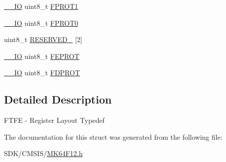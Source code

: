 \begin{DoxyCompactItemize}
\item 
\mbox{\hyperlink{core__cm4_8h_aec43007d9998a0a0e01faede4133d6be}{\+\_\+\+\_\+\+IO}} uint8\+\_\+t \mbox{\hyperlink{group___v_r_e_f___peripheral___access___layer_ga76768ab2e99c7ff366200d94db19eeea}{F\+P\+R\+O\+T1}}
\item 
\mbox{\hyperlink{core__cm4_8h_aec43007d9998a0a0e01faede4133d6be}{\+\_\+\+\_\+\+IO}} uint8\+\_\+t \mbox{\hyperlink{group___v_r_e_f___peripheral___access___layer_ga85880705c28fcc199112e1ed40773677}{F\+P\+R\+O\+T0}}
\item 
uint8\+\_\+t \mbox{\hyperlink{group___v_r_e_f___peripheral___access___layer_ga1d386ff4b328960f430b4c63f61423fa}{R\+E\+S\+E\+R\+V\+E\+D\+\_}} \mbox{[}2\mbox{]}
\item 
\mbox{\hyperlink{core__cm4_8h_aec43007d9998a0a0e01faede4133d6be}{\+\_\+\+\_\+\+IO}} uint8\+\_\+t \mbox{\hyperlink{group___v_r_e_f___peripheral___access___layer_gae38802fa1bc51a2b95592c00674eeabb}{F\+E\+P\+R\+OT}}
\item 
\mbox{\hyperlink{core__cm4_8h_aec43007d9998a0a0e01faede4133d6be}{\+\_\+\+\_\+\+IO}} uint8\+\_\+t \mbox{\hyperlink{group___v_r_e_f___peripheral___access___layer_ga0e61864bd2fa7d2a00f4b6fd9bfe83f2}{F\+D\+P\+R\+OT}}
\end{DoxyCompactItemize}


\subsection{Detailed Description}
F\+T\+FE -\/ Register Layout Typedef 

The documentation for this struct was generated from the following file\+:\begin{DoxyCompactItemize}
\item 
S\+D\+K/\+C\+M\+S\+I\+S/\mbox{\hyperlink{_m_k64_f12_8h}{M\+K64\+F12.\+h}}\end{DoxyCompactItemize}
